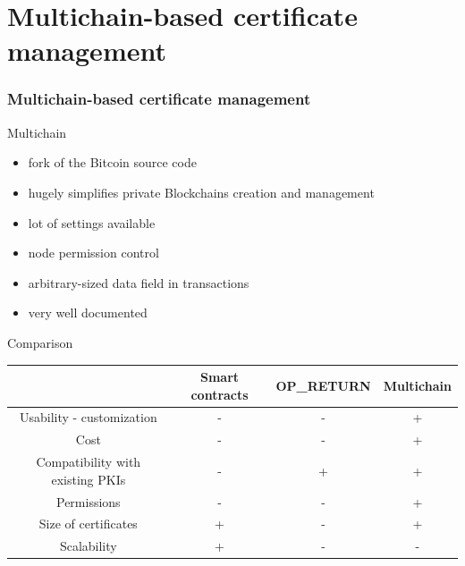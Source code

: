 \section[Multichain-based certificate verification]{Multichain-based certificate management}
\begin{frame}
\frametitle{Multichain-based certificate management}
\begin{alertblock}{Multichain}
	\begin{itemize}
		\item fork of the Bitcoin source code
		\item hugely simplifies private Blockchains creation and management
		\item lot of settings available
		\item node permission control
		\item arbitrary-sized data field in transactions
		\item very well documented
	\end{itemize}
\end{alertblock}
\end{frame}


\begin{frame}{Comparison}

\begin{tabular}{|c|c|c|c|}
\hline 
  & Smart contracts & OP\_RETURN & Multichain \\ 
\hline 
Usability - customization & - & - & + \\ 
\hline 
Cost & - & - & + \\ 
\hline 
Compatibility with existing PKIs & - & + & + \\ 
\hline 
Permissions & - & - & + \\ 
\hline 
Size of certificates & + & - & + \\ 
\hline 
Scalability & + & - & - \\ 
\hline 
\end{tabular} 

\end{frame}


